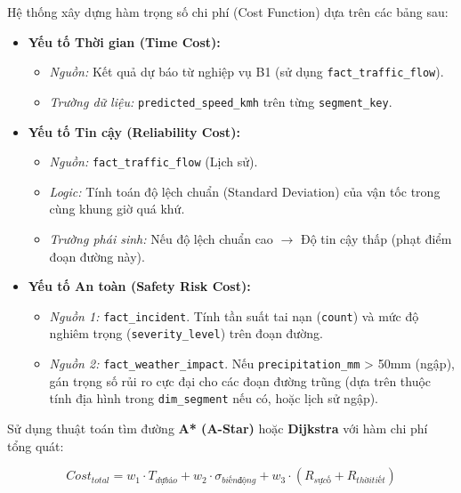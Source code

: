 Hệ thống xây dựng hàm trọng số chi phí (Cost Function) dựa trên các bảng sau:

\begin{itemize}
    \item \textbf{Yếu tố Thời gian (Time Cost):}
    \begin{itemize}
        \item \textit{Nguồn:} Kết quả dự báo từ nghiệp vụ B1 (sử dụng \texttt{fact\_traffic\_flow}).
        \item \textit{Trường dữ liệu:} \texttt{predicted\_speed\_kmh} trên từng \texttt{segment\_key}.
    \end{itemize}

    \item \textbf{Yếu tố Tin cậy (Reliability Cost):}
    \begin{itemize}
        \item \textit{Nguồn:} \texttt{fact\_traffic\_flow} (Lịch sử).
        \item \textit{Logic:} Tính toán độ lệch chuẩn (Standard Deviation) của vận tốc trong cùng khung giờ quá khứ.
        \item \textit{Trường phái sinh:} Nếu độ lệch chuẩn cao $\rightarrow$ Độ tin cậy thấp (phạt điểm đoạn đường này).
    \end{itemize}

    \item \textbf{Yếu tố An toàn (Safety Risk Cost):}
    \begin{itemize}
        \item \textit{Nguồn 1:} \texttt{fact\_incident}. Tính tần suất tai nạn (\texttt{count}) và mức độ nghiêm trọng (\texttt{severity\_level}) trên đoạn đường.
        \item \textit{Nguồn 2:} \texttt{fact\_weather\_impact}. Nếu \texttt{precipitation\_mm} > 50mm (ngập), gán trọng số rủi ro cực đại cho các đoạn đường trũng (dựa trên thuộc tính địa hình trong \texttt{dim\_segment} nếu có, hoặc lịch sử ngập).
    \end{itemize}
\end{itemize}

Sử dụng thuật toán tìm đường \textbf{A* (A-Star)} hoặc \textbf{Dijkstra} với hàm chi phí tổng quát:

\[ Cost_{total} = w_1 \cdot T_{dự báo} + w_2 \cdot \sigma_{biến động} + w_3 \cdot (R_{sự cố} + R_{thời tiết}) \]


